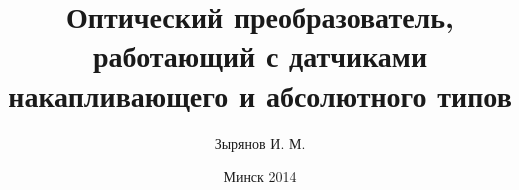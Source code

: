 \title[Энкодеры: инкрементальные и абсолютные]{Оптический преобразователь, работающий с датчиками накапливающего и абсолютного типов}
\author{Зырянов И. М.}
\date{Минск 2014}
